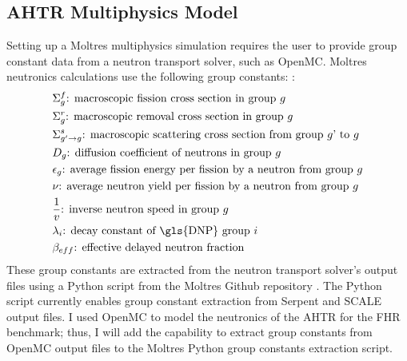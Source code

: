 \subsection{AHTR Multiphysics Model}
\label{sec:ahtr_multiphysics_model}
Setting up a Moltres multiphysics simulation requires the user to provide group 
constant data from a neutron transport solver, such as OpenMC. 
Moltres neutronics calculations use the following group constants:
\cite{lindsay_introduction_2018,park_advancement_2020}: 
\begin{align*}
  &\Sigma^f_{g} \text{: macroscopic fission cross section in group $g$} \\
  &\Sigma^r_{g} \text{: macroscopic removal cross section in group $g$} \\
  &\Sigma^s_{g' \rightarrow g} \text{: macroscopic scattering cross section
  from group $g$' to $g$} \\
  &D_g \text{: diffusion coefficient of neutrons in group $g$} \\
  &\epsilon_g \text{: average fission energy per fission by a neutron from
  group $g$} \\
  &\nu \text{: average neutron yield per fission by a neutron from group
  $g$} \\
  &\frac{1}{v} \text{: inverse neutron speed in group $g$} \\
  &\lambda_i \text{: decay constant of \gls{DNP} group $i$} \\
  &\beta_{eff} \text{: effective delayed neutron fraction} 
\end{align*}
These group constants are extracted from the neutron transport solver's output files 
using a Python script from the Moltres Github repository \cite{lindsay_moltres_2017}. 
The Python script currently enables group constant extraction from Serpent 
\cite{leppanen_serpent_2014} and SCALE \cite{bucholz_scale:_1982} output files.
I used OpenMC to model the neutronics of the \gls{AHTR} for the \gls{FHR} benchmark;
thus, I will add the capability to extract group constants from OpenMC output 
files to the Moltres Python group constants extraction script. 

